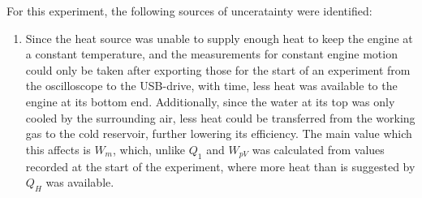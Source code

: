 \documentclass[titlepage]{article}
\begin{document}
For this experiment, the following sources of unceratainty were identified:
\begin{enumerate}
    \item Since the heat source was unable to supply enough heat to keep the engine at a constant temperature, and the measurements for constant engine motion could only be taken after exporting those for the start of an experiment from the oscilloscope to the USB-drive, with time, less heat was available to the engine at its bottom end. Additionally, since the water at its top was only cooled by the surrounding air, less heat could be transferred from the working gas to the cold reservoir, further lowering its efficiency. The main value which this affects is \(W_m\), which, unlike \(Q_1\) and \(W_{pV}\) was calculated from values recorded at the start of the experiment, where more heat than is suggested by \(Q_H\) was available.
\end{enumerate}
\end{document}
